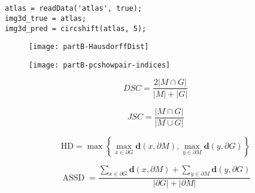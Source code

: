 \chapter{}

\begin{latin}
\begin{lstlisting}[frame=none]
atlas = readData('atlas', true);
img3d_true = atlas;
img3d_pred = circshift(atlas, 5);
\end{lstlisting}
\end{latin}

\begin{figure}[t!]
	\centering
	\texttt{[image: partB-HausdorffDist]}
	\caption{}
	\label{fig:partB:HausdorffDist}
\end{figure}

\begin{figure}[t!]
	\centering
	\texttt{[image: partB-pcshowpair-indices]}
	\caption{}
	\label{fig:partB:pcshowpair-indices}
\end{figure}

\begin{equation}DSC=\frac{2|M \cap G|}{|M|+|G|}\end{equation}

\begin{equation}JSC=\frac{|M \cap G|}{|M \cup G|}\end{equation}

\begin{equation}\mathrm{HD}=\max \left\{\max _{x \in \partial G} \mathbf{d}(x, \partial M), \max _{y \in \partial M} \mathbf{d}(y, \partial G)\right\}\end{equation}

\begin{equation}\operatorname{ASSD}=\frac{\sum_{x \in \partial G} \mathbf{d}(x, \partial M)+\sum_{y \in \partial M} \mathbf{d}(y, \partial G)}{|\partial G|+|\partial M|}\end{equation}


\begin{table}[b!]
	\centering
	\begin{LTR}
			\end{LTR}
\end{table}





